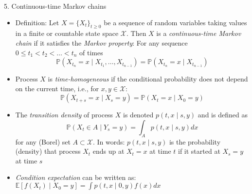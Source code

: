 \documentclass[10pt]{beamer}
\begin{document}
\begin{frame}{5. Continuous-time Markov chains}

{\small
\begin{itemize}
\item Definition: Let $X = \{X_t\}_{t \geq 0}$ be a sequence of random variables taking values in a finite or countable state space $\mathcal X$. Then $X$ is a \textit{continuous-time Markov chain} if it satisfies the \textit{Markov property}: For any sequence $0 \leq t_1 < t_2 < \ldots < t_n$ of times 
\begin{equation*}
	\mathbb P(X_{t_n} = x \mid X_{t_1}, \ldots, X_{t_{n-1}} ) = \mathbb P(X_{t_n} = x \mid X_{t_{n-1}} )
\end{equation*}


\item Process $X$ is \textit{time-homogeneous} if the conditional probability does not depend on the current time, i.e., for $x, y \in \mathcal X$:
\begin{equation*}
	\mathbb P(X_{t+s} = x \mid X_s = y) = \mathbb P(X_t = x \mid X_0 = y)
\end{equation*}

\item The \textit{transition density} of process $X$ is denoted $p(t, x \mid s, y)$ and is defined as 
\begin{equation*}
	\mathbb P(X_t \in A \mid Y_s = y) = \int_A p(t, x \mid s, y) dx 
\end{equation*}
for any (Borel) set $A \subset \mathcal X$. In words: $p(t, x \mid s, y)$ is the probability (density) that process $X_t$ ends up at $X_t = x$ at time $t$ if it started at $X_s = y$ at time $s$

\item \textit{Condition expectation} can be written as: $\mathbb E[ f(X_t) \mid X_0 = y] = \int p(t, x \mid 0, y) f(x) dx$
\end{itemize}
}
\end{frame}
\end{document}
